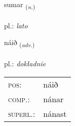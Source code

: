 \documentclass[frontgrid, backgrid]{flacards}\usepackage[]{graphicx}\usepackage[]{xcolor}
\begin{document}
\renewcommand{\blhead}{\vskip5pt {\small\bfseries\footnotesize Nafnorð | Noun }}
\renewcommand{\bcfoot}{\vskip5pt \hspace{2pt}{\small\bfseries\footnotesize 1K}}


{sumar \small{\textsubscript{(\textit{n.})}} \\[1ex] %
\textphonetic{[sʏːmar]} \\
pl.: \emph{lato} \\  [2ex]
\renewcommand*{\arraystretch}{0.8}
}

\renewcommand{\flhead}{\vskip5pt \fboxsep=0pt {\small\bfseries\footnotesize Atviksorð | Adverb}}
\renewcommand{\fcfoot}{\vskip5pt \fboxsep=0pt \hspace{2pt}{\small\bfseries\footnotesize 1K}}

\renewcommand{\blhead}{\vskip5pt {\small\bfseries\footnotesize Atviksorð | Adverb }}
\renewcommand{\bcfoot}{\vskip5pt \hspace{2pt}{\small\bfseries\footnotesize 1K}}


{náið \small{\textsubscript{(\textit{adv.})}} \\[1ex] %
\textphonetic{[nauːɪð]} \\
pl.: \emph{dokładnie} \\  [2ex]
\renewcommand*{\arraystretch}{0.8}
\begin{tabular}{ll}
\textsc{pos}: & náið \\ 
\textsc{comp.}: & nánar \\ 
\textsc{superl.}: & nánast \\
\end{tabular}
}

\renewcommand{\flhead}{\vskip5pt \fboxsep=0pt {\small\bfseries\footnotesize Sagnorð | Verb}}
\renewcommand{\fcfoot}{\vskip5pt \fboxsep=0pt \hspace{2pt}{\small\bfseries\footnotesize 1K}}
\end{document}
